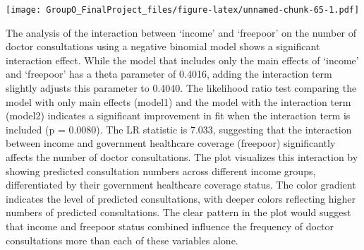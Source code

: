 \documentclass[
]{article}
\newenvironment{Shaded}{\begin{snugshade}}{\end{snugshade}}
\newcommand{\AttributeTok}[1]{\textcolor[rgb]{0.13,0.29,0.53}{#1}}
\newcommand{\CommentTok}[1]{\textcolor[rgb]{0.56,0.35,0.01}{\textit{#1}}}
\newcommand{\FunctionTok}[1]{\textcolor[rgb]{0.13,0.29,0.53}{\textbf{#1}}}
\newcommand{\NormalTok}[1]{#1}
\newcommand{\OtherTok}[1]{\textcolor[rgb]{0.56,0.35,0.01}{#1}}
\newcommand{\SpecialCharTok}[1]{\textcolor[rgb]{0.81,0.36,0.00}{\textbf{#1}}}
\newcommand{\StringTok}[1]{\textcolor[rgb]{0.31,0.60,0.02}{#1}}
\begin{document}
\begin{Shaded}
\end{Shaded}

\texttt{[image: GroupO\_FinalProject\_files/figure-latex/unnamed-chunk-65-1.pdf]}

The analysis of the interaction between `income' and `freepoor' on the
number of doctor consultations using a negative binomial model shows a
significant interaction effect. While the model that includes only the
main effects of `income' and `freepoor' has a theta parameter of 0.4016,
adding the interaction term slightly adjusts this parameter to 0.4040.
The likelihood ratio test comparing the model with only main effects
(model1) and the model with the interaction term (model2) indicates a
significant improvement in fit when the interaction term is included (p
= 0.0080). The LR statistic is 7.033, suggesting that the interaction
between income and government healthcare coverage (freepoor)
significantly affects the number of doctor consultations. The plot
visualizes this interaction by showing predicted consultation numbers
across different income groups, differentiated by their government
healthcare coverage status. The color gradient indicates the level of
predicted consultations, with deeper colors reflecting higher numbers of
predicted consultations. The clear pattern in the plot would suggest
that income and freepoor status combined influence the frequency of
doctor consultations more than each of these variables alone.
\end{document}
